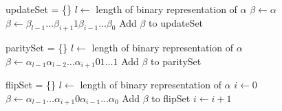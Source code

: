 \documentclass[pdftex,pra,aps,twocolumn,twoside]{revtex4-1}
\theoremstyle{plain}
\theoremstyle{note}
\newcommand\+{{\footnotesize \raisebox{0.3ex}{+}}}
\begin{document}
\begin{algorithm}[htbp]
\begin{algorithmic}[1]
\State updateSet = \{\}
\State $l \gets $ length of binary representation of $\alpha$
\State $\beta \gets \alpha$
        \State $\beta \gets \beta_{l-1}\ldots\beta_{i+1}1\beta_{i-1}\ldots\beta_0$
            \State Add $\beta$ to updateSet
        \EndIf
    \EndIf
\EndFor
\end{algorithmic}
    \caption{\label{GenerateUpdateSet}\textsc{GenerateUpdateSet}}\label{alg:cap}
\end{algorithm}
\begin{algorithm}[htbp]
    \caption{\label{GenerateParitySet}\textsc{GenerateParitySet}}\label{alg:cap}
\begin{algorithmic}[1]
\State paritySet = \{\}
\State $l \gets $ length of binary representation of $\alpha$
        \State $\beta \gets \alpha_{l-1}\alpha_{l-2}\ldots\alpha_{i+1}01\ldots 1$
        \State Add $\beta$ to paritySet 
    \EndIf
\EndFor
\end{algorithmic}
\end{algorithm}
\begin{algorithm}[htbp]
    \caption{\label{GenerateFlipSet}\textsc{GenerateFlipSet}}\label{alg:cap}
\begin{algorithmic}[1]
\State flipSet = \{\}
\State $l \gets $ length of binary representation of $\alpha$
\State $i \gets 0$
    \State $\beta \gets \alpha_{l-1}\ldots \alpha_{i+1}0\alpha_{i-1} \ldots \alpha_0$
    \State Add $\beta$ to flipSet
    \State $i \gets i + 1$
\EndWhile
\end{algorithmic}
\end{algorithm}
\pagebreak
\end{document}
